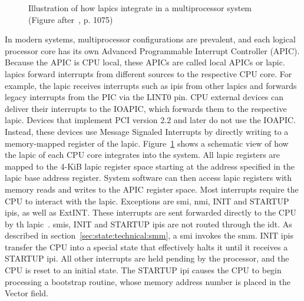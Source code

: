
\begin{figure}
  \begin{center}
    
    \caption{Illustration of how \glspl{lapic} integrate in a
    multiprocessor system (Figure after~\cite{amd_manual}, p. 1075)}
    \label{fig:state:technical:lapic}
  \end{center}
\end{figure}

In modern systems, multiprocessor configurations are prevalent, and each logical
processor core has its own Advanced Programmable Interrupt Controller (APIC).
Because the APIC is CPU local, these APICs are called local APICs or
\gls{lapic}. \glspl{lapic} forward interrupts from different sources to the
respective CPU core. For example, the \gls{lapic} receives interrupts such as
\glspl{ipi} from other \glspl{lapic} and forwards legacy interrupts from the PIC
via the LINT0 pin. CPU external devices can deliver their interrupts to the
IOAPIC, which forwards them to the respective \gls{lapic}. Devices that
implement PCI version 2.2 and later do not use the IOAPIC. Instead, these
devices use Message Signaled Interrupts by directly writing to a memory-mapped
register of the \gls{lapic}. Figure~\ref{fig:state:technical:lapic} shows a
schematic view of how the \gls{lapic} of each CPU core integrates into the
system. All \gls{lapic} registers are mapped to the 4-KiB \gls{lapic} register
space starting at the address specified in the \gls{lapic} base address
register. System software can then access \gls{lapic} registers with memory
reads and writes to the APIC register space. Most interrupts require the CPU to
interact with the \gls{lapic}. Exceptions are \gls{smi}, \gls{nmi}, INIT and
STARTUP \glspl{ipi}, as well as ExtINT. These interrupts are sent forwarded
directly to the CPU by th \gls{lapic}~\cite{amd_manual, intel_sdm}. \glspl{smi},
INIT and STARTUP \glspl{ipi} are not routed through the \gls{idt}. As described
in section~\ref{sec:state:technical:smm}, a \gls{smi} invokes the \gls{smm}.
INIT \glspl{ipi} transfer the CPU into a special state that effectively halts it
until it receives a STARTUP \gls{ipi}. All other interrupts are held pending by
the processor, and the CPU is reset to an initial state. The STARTUP \gls{ipi}
causes the CPU to begin processing a bootstrap routine, whose memory address
number is placed in the Vector field.

